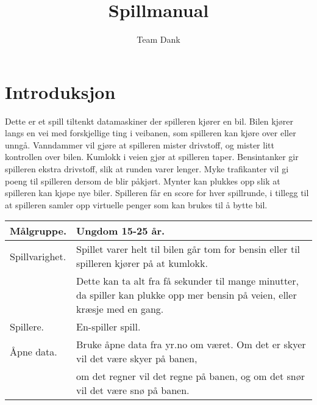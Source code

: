 \documentclass[paper=a4]{article}
\title{Spillmanual}
\author{Team Dank}
\begin{document}
\maketitle

\section{Introduksjon}
Dette er et spill tiltenkt datamaskiner der spilleren kjører en bil.
Bilen kjører langs en vei med forskjellige ting i veibanen, som spilleren kan kjøre over eller unngå.
Vanndammer vil gjøre at spilleren mister drivstoff, og mister litt kontrollen over bilen.
Kumlokk i veien gjør at spilleren taper.
Bensintanker gir spilleren ekstra drivstoff, slik at runden varer lenger.
Myke trafikanter vil gi poeng til spilleren dersom de blir påkjørt.
Mynter kan plukkes opp slik at spilleren kan kjøpe nye biler.
Spilleren får en score for hver spillrunde, i tillegg til at spilleren samler opp virtuelle penger som kan brukes til å bytte bil.
\begin{center}
\begin{tabular}{ | m{5cm} | m{8cm} | }
\hline
Målgruppe. & Ungdom 15-25 år. \\ \hline
Spillvarighet. & Spillet varer helt til bilen går tom for bensin eller til spilleren kjører på at kumlokk.\\&
Dette kan ta alt fra få sekunder til mange minutter, da spiller kan plukke opp mer bensin på veien, eller kræsje med en gang.\\ \hline
Spillere. & En-spiller spill. \\ \hline
Åpne data. & Bruke åpne data fra yr.no om været. Om det er skyer vil det være skyer på banen,\\&
om det regner vil det regne på banen, og om det snør vil det være snø på banen.\\ \hline
\end{tabular}
\end{center}

\end{document}
